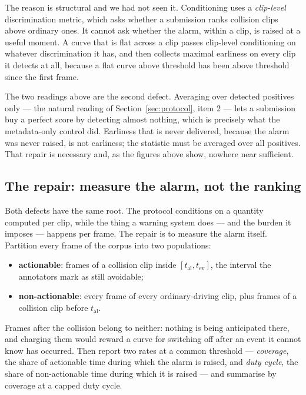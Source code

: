 The reason is structural and we had not seen it. Conditioning uses a
\emph{clip-level} discrimination metric, which asks whether a submission ranks
collision clips above ordinary ones. It cannot ask whether the alarm, within a
clip, is raised at a useful moment. A curve that is flat across a clip passes
clip-level conditioning on whatever discrimination it has, and then collects
maximal earliness on every clip it detects at all, because a flat curve above
threshold has been above threshold since the first frame.

The two readings above are the second defect. Averaging over detected
positives only --- the natural reading of Section~\ref{sec:protocol}, item 2
--- lets a submission buy a perfect score by detecting almost nothing, which is
precisely what the metadata-only control did. Earliness that is never
delivered, because the alarm was never raised, is not earliness; the statistic
must be averaged over all positives. That repair is necessary and, as the
figures above show, nowhere near sufficient.

\subsection{The repair: measure the alarm, not the ranking}

Both defects have the same root. The protocol conditions on a quantity computed
per clip, while the thing a warning system does --- and the burden it imposes
--- happens per frame. The repair is to measure the alarm itself. Partition
every frame of the corpus into two populations:

\begin{itemize}
\item \textbf{actionable}: frames of a collision clip inside
  $[t_{\text{al}}, t_{\text{ev}}]$, the interval the annotators mark as still
  avoidable;
\item \textbf{non-actionable}: every frame of every ordinary-driving clip, plus
  frames of a collision clip before $t_{\text{al}}$.
\end{itemize}

Frames after the collision belong to neither: nothing is being anticipated
there, and charging them would reward a curve for switching off after an event
it cannot know has occurred. Then report two rates at a common threshold ---
\emph{coverage}, the share of actionable time during which the alarm is raised,
and \emph{duty cycle}, the share of non-actionable time during which it is
raised --- and summarise by coverage at a capped duty cycle.

